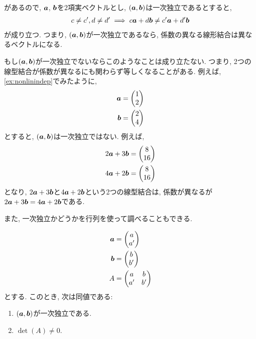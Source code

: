 \begin{remark}
  があるので,
  $\boldsymbol{a}$, $\boldsymbol{b}$を$2$項実ベクトルとし,
  $(\boldsymbol{a},\boldsymbol{b})$は一次独立であるとすると,
  \begin{align*}
    c\neq c', d\neq d' \implies c\boldsymbol{a} + d\boldsymbol{b}\neq c'\boldsymbol{a}+d'\boldsymbol{b}
  \end{align*}
  が成り立つ.
  つまり, $(\boldsymbol{a},\boldsymbol{b})$が一次独立であるなら,
  係数の異なる線形結合は異なるベクトルになる.
  
  もし$(\boldsymbol{a},\boldsymbol{b})$が一次独立でないならこのようなことは成り立たない.
  つまり, 2つの線型結合が係数が異なるにも関わらず等しくなることがある.
  例えば, \cref{ex:nonlinindep}でみたように,
  \begin{align*}
  \boldsymbol{a}&=\begin{pmatrix}1\\2\end{pmatrix}\\
  \boldsymbol{b}&=\begin{pmatrix}2\\4\end{pmatrix}
  \end{align*}
  とすると,
  $(\boldsymbol{a},\boldsymbol{b})$は一次独立ではない.
  例えば,
  \begin{align*}
  2\boldsymbol{a}+3\boldsymbol{b}&=\begin{pmatrix}8\\16\end{pmatrix}\\
  4\boldsymbol{a}+2\boldsymbol{b}&=\begin{pmatrix}8\\16\end{pmatrix}
  \end{align*}
  となり,
  $2\boldsymbol{a}+3\boldsymbol{b}$と$4\boldsymbol{a}+2\boldsymbol{b}$という2つの線型結合は,
  係数が異なるが
  $2\boldsymbol{a}+3\boldsymbol{b}=4\boldsymbol{a}+2\boldsymbol{b}$である.
\end{remark}

また, 一次独立かどうかを行列を使って調べることもできる.
\begin{theorem}
  \label{thm:linindep:det}
  \begin{align*}
    \boldsymbol{a}&=\begin{pmatrix}a\\a'\end{pmatrix}\\
    \boldsymbol{b}&=\begin{pmatrix}b\\b'\end{pmatrix}\\
    A&=\begin{pmatrix}a&b\\a'&b'\end{pmatrix}
  \end{align*}
  とする.  このとき, 次は同値である:
  \begin{enumerate}
  \item \label{thm:linindep:det:item:linindep}
    $(\boldsymbol{a},\boldsymbol{b})$が一次独立である.
  \item\label{thm:linindep:det:item:det}
    $\det(A)\neq 0$.
  \end{enumerate}
\end{theorem}

